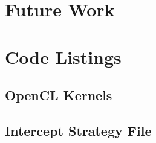 \documentclass[10pt]{article}
\begin{document}
\section{Future Work}

\appendix
\cleardoublepage{}

\section{Code Listings \label{sec:Code-Listings}}

\subsection{OpenCL Kernels\label{sub:OpenCL-Kernels}}

\subsection{Intercept Strategy File}

\cleardoublepage{}



\end{document}
